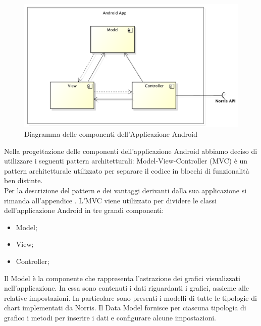 	\begin{figure}[H]\centering
        \includegraphics[width=\textwidth]{SpecificaTecnica/Pics/ComponentiApplicazione}
        \caption{Diagramma delle componenti dell'Applicazione Android}
    \end{figure}
	Nella progettazione delle componenti dell'applicazione Android abbiamo deciso di utilizzare i seguenti pattern architetturali:
		Model-View-Controller (MVC) è un pattern architetturale utilizzato per separare il codice in blocchi di funzionalità ben distinte.\\
		Per la descrizione del pattern e dei vantaggi derivanti dalla sua applicazione si rimanda all'appendice .
		L'MVC viene utilizzato per dividere le classi dell'applicazione Android in tre grandi componenti:
		\begin{itemize}
		\item Model;
		\item View;
		\item Controller;
		\end{itemize}
        Il Model è la componente che rappresenta l'astrazione dei grafici visualizzati nell'applicazione. In essa sono contenuti i dati riguardanti i grafici, assieme alle relative impostazioni. In particolare sono presenti i modelli di tutte le tipologie di chart implementati da Norris. Il Data Model fornisce per ciascuna tipologia di grafico i metodi per inserire i dati e configurare alcune impostazioni. 
    
